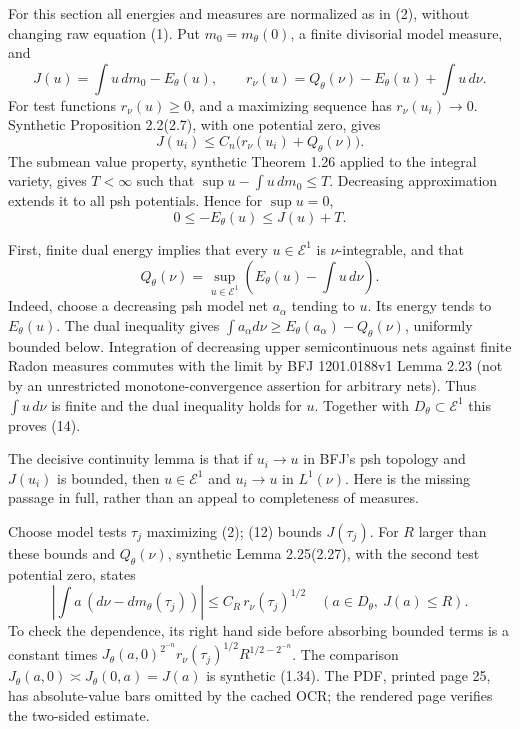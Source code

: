 \documentclass[11pt]{article}
\begin{document}
For this section all energies and measures are normalized as in (2), without changing raw equation (1). Put \(m_0=m_\theta(0)\), a finite divisorial model measure, and
\[
 J(u)=\int u\,dm_0-E_\theta(u),\qquad
 r_\nu(u)=Q_\theta(\nu)-E_\theta(u)+\int u\,d\nu.
 \tag{11}
\]
For test functions \(r_\nu(u)\geq0\), and a maximizing sequence has \(r_\nu(u_i)\to0\). Synthetic Proposition 2.2(2.7), with one potential zero, gives
\[
 J(u_i)\leq C_n\big(r_\nu(u_i)+Q_\theta(\nu)\big).
 \tag{12}
\]
The submean value property, synthetic Theorem 1.26 applied to the integral variety, gives \(T<\infty\) such that \(\sup u-\int u\,dm_0\leq T\). Decreasing approximation extends it to all psh potentials. Hence for \(\sup u=0\),
\[
 0\leq-E_\theta(u)\leq J(u)+T.
 \tag{13}
\]

First, finite dual energy implies that every \(u\in\mathcal E^1\) is \(\nu\)-integrable, and that
\[
 Q_\theta(\nu)=\sup_{u\in\mathcal E^1}
 \left(E_\theta(u)-\int u\,d\nu\right).
 \tag{14}
\]
Indeed, choose a decreasing psh model net \(a_\alpha\) tending to \(u\). Its energy tends to \(E_\theta(u)\). The dual inequality gives \(\int a_\alpha d\nu\geq E_\theta(a_\alpha)-Q_\theta(\nu)\), uniformly bounded below. Integration of decreasing upper semicontinuous nets against finite Radon measures commutes with the limit by BFJ 1201.0188v1 Lemma 2.23 (not by an unrestricted monotone-convergence assertion for arbitrary nets). Thus \(\int u\,d\nu\) is finite and the dual inequality holds for \(u\). Together with \(D_\theta\subset\mathcal E^1\) this proves (14).

The decisive continuity lemma is that if \(u_i\to u\) in BFJ's psh topology and \(J(u_i)\) is bounded, then \(u\in\mathcal E^1\) and \(u_i\to u\) in \(L^1(\nu)\). Here is the missing passage in full, rather than an appeal to completeness of measures.

Choose model tests \(\tau_j\) maximizing (2); (12) bounds \(J(\tau_j)\). For \(R\) larger than these bounds and \(Q_\theta(\nu)\), synthetic Lemma 2.25(2.27), with the second test potential zero, states
\[
 \left|\int a\,(d\nu-dm_\theta(\tau_j))\right|
 \leq C_R\,r_\nu(\tau_j)^{1/2}
 \quad(a\in D_\theta,\ J(a)\leq R).
 \tag{15}
\]
To check the dependence, its right hand side before absorbing bounded terms is a constant times \(J_\theta(a,0)^{2^{-n}}r_\nu(\tau_j)^{1/2}R^{1/2-2^{-n}}\). The comparison \(J_\theta(a,0)\asymp J_\theta(0,a)=J(a)\) is synthetic (1.34). The PDF, printed page 25, has absolute-value bars omitted by the cached OCR; the rendered page verifies the two-sided estimate.
\end{document}
